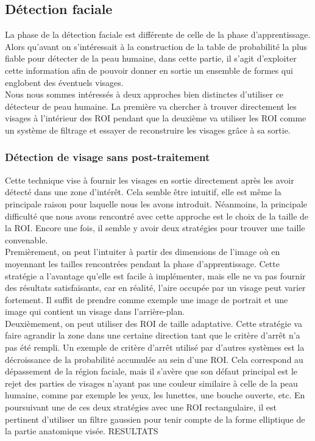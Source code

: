 \documentclass[a4paper,11pt]{article}
\begin{document}
\subsection{Détection faciale}

La phase de la détection faciale est différente de celle de la phase d'apprentissage. 
Alors qu'avant on s'intéressait à la construction de la table de probabilité la plus fiable pour détecter de la peau humaine, dans cette partie, il s'agit d'exploiter cette information afin de pouvoir donner en sortie un ensemble de formes qui englobent des éventuels visages.\\
\newline
Nous nous sommes intéressés à deux approches bien distinctes d'utiliser ce \og détecteur de peau humaine\fg{}. 
La première va chercher à trouver directement les visages à l'intérieur des ROI pendant que la deuxième va utiliser les ROI comme un système de filtrage et essayer de reconstruire les visages grâce à sa sortie.
\newline
\subsubsection{Détection de visage sans post-traitement}
Cette technique vise à fournir les visages en sortie directement après les avoir détecté dans une zone d'intérêt.
Cela semble être intuitif, elle est même la principale raison pour laquelle nous les avons introduit.
Néanmoins, la principale difficulté que nous avons rencontré avec cette approche est le choix de la taille de la ROI.
Encore une fois, il semble y avoir deux stratégies pour trouver une taille convenable.\\
\newline
Premièrement, on peut l'intuiter à partir des dimensions de l'image où en moyennant les tailles rencontrées pendant la phase d'apprentissage.
Cette stratégie a l'avantage qu'elle est facile à implémenter, mais elle ne va pas fournir des résultats satisfaisants, car en réalité, l'aire occupée par un visage peut varier fortement.
Il suffit de prendre comme exemple une image de portrait et une image qui contient un visage dans l'arrière-plan.\\
\newline
Deuxièmement, on peut utiliser des ROI de taille adaptative. 
Cette stratégie va faire agrandir la zone dans une certaine direction tant que le critère d'arrêt n'a pas été rempli.
Un exemple de critère d'arrêt utilisé par d'autres systèmes est la décroissance de la probabilité accumulée au sein d'une ROI.
Cela correspond au dépassement de la région faciale, mais il s'avère que son défaut principal est le rejet des parties de visages n'ayant pas une couleur similaire à celle de la peau humaine, comme par exemple les yeux, les lunettes, une bouche ouverte, etc.
\newline
\newline
En poursuivant une de ces deux stratégies avec une ROI rectangulaire, il est pertinent d'utiliser un filtre gaussien pour tenir compte de la forme elliptique de la partie anatomique visée.
RESULTATS
\end{document}
